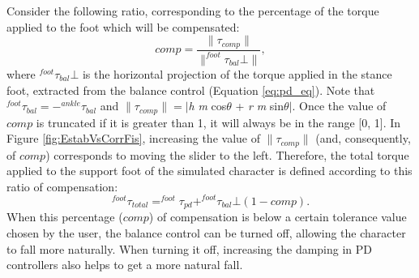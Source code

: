 \documentclass[tog]{acmsiggraph}
\begin{document}
Consider the following ratio, corresponding to the percentage of the torque applied to the foot which will be compensated:
%
\begin{equation}
 comp  = \frac{\| \tau_{comp} \|}{\| ^{foot}\tau_{bal}\bot \|}, %
\end{equation}
%
where $^{foot}\tau_{bal}\bot$ is the horizontal projection of the torque applied in the stance foot, extracted from the balance control (Equation \ref{eq:pd_eq}). %
Note that $^{foot}\tau_{bal} = -^{ankle}\tau_{bal}$ and $\| \tau_{comp} \| = |$\textit{h} \textit{m} cos$\theta$ + \textit{r} \textit{m} sin$\theta$$|$.
Once the value of $comp$ is truncated if it is greater than 1, %
it will always be in the range [0, 1].
In Figure \ref{fig:EstabVsCorrFis}, increasing the value of $\| \tau_{comp} \|$ (and, consequently, of $comp$) corresponds to moving the slider to the left.
Therefore, the total torque applied to the support foot of the simulated character is defined according to this ratio of compensation:
%
\begin{equation}
  ^{foot}\tau_{total} = ^{foot}\tau_{pd} + ^{foot}\tau_{bal}\bot (1-comp).
\end{equation}
%
%
When this percentage ($comp$) of compensation is below a certain tolerance value chosen by the user, the balance control can be turned off, allowing the character to fall more naturally.
When turning it off, increasing the damping in PD controllers also helps to get a more natural fall.
\end{document}
